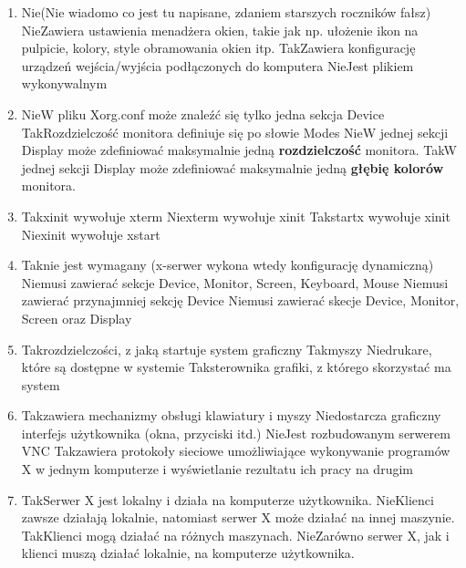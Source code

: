 \begin{enumerate}
	\item {}
	{Nie}{(Nie wiadomo co jest tu napisane, zdaniem starszych roczników fałsz)}
	{Nie}{Zawiera ustawienia menadżera okien, takie jak np. ułożenie ikon na pulpicie, kolory, style obramowania okien itp.}
	{Tak}{Zawiera konfigurację urządzeń wejścia/wyjścia podłączonych do komputera}
	{Nie}{Jest plikiem wykonywalnym}
	
	\item {}
	{Nie}{W pliku Xorg.conf może znaleźć się tylko jedna sekcja Device}
	{Tak}{Rozdzielczość monitora definiuje się po słowie Modes}
	{Nie}{W jednej sekcji Display może zdefiniować maksymalnie jedną \textbf{rozdzielczość} monitora.}
	{Tak}{W jednej sekcji Display może zdefiniować maksymalnie jedną \textbf{głębię kolorów} monitora.}
	
	\item {}
	{Tak}{xinit wywołuje xterm}
	{Nie}{xterm wywołuje xinit}
	{Tak}{startx wywołuje xinit}
	{Nie}{xinit wywołuje xstart}
	
	\item {}
	{Tak}{nie jest wymagany (x-serwer wykona wtedy konfigurację dynamiczną)}
	{Nie}{musi zawierać sekcje Device, Monitor, Screen, Keyboard, Mouse}
	{Nie}{musi zawierać przynajmniej sekcję Device}
	{Nie}{musi zawierać skecje Device, Monitor, Screen oraz Display}
	
	\item {}
	{Tak}{rozdzielczości, z jaką startuje system graficzny}
	{Tak}{myszy}
	{Nie}{drukare, które są dostępne w systemie}
	{Tak}{sterownika grafiki, z którego skorzystać ma system}
	
	\item {}
	{Tak}{zawiera mechanizmy obsługi klawiatury i myszy}
	{Nie}{dostarcza graficzny interfejs użytkownika (okna, przyciski itd.)}
	{Nie}{Jest rozbudowanym serwerem VNC}
	{Tak}{zawiera protokoły sieciowe umożliwiające wykonywanie programów X w jednym komputerze i wyświetlanie rezultatu ich pracy na drugim}
	
	\item {}
	{Tak}{Serwer X jest lokalny i działa na komputerze użytkownika.}
	{Nie}{Klienci zawsze działają lokalnie, natomiast serwer X może działać na innej maszynie.}
	{Tak}{Klienci mogą działać na różnych maszynach.}
	{Nie}{Zarówno serwer X, jak i klienci muszą działać lokalnie, na komputerze użytkownika.}
	

\end{enumerate}
